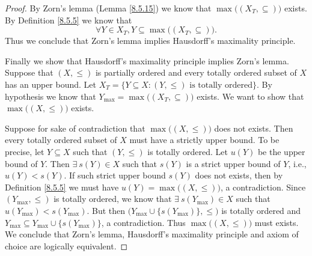 \begin{proof}
    By Zorn's lemma (Lemma \ref{8.5.15}) we know that \(\max\big((X_T, \subseteq)\big)\) exists.
    By Definition \ref{8.5.5} we know that
    \[
        \forall Y \in X_T, Y \subseteq \max\big((X_T, \subseteq)\big).
    \]
    Thus we conclude that Zorn's lemma implies Hausdorff's maximality principle.

    Finally we show that Hausdorff's maximality principle implies Zorn's lemma.
    Suppose that \((X, \leq)\) is partially ordered and every totally ordered subset of \(X\) has an upper bound.
    Let \(X_T = \{Y \subseteq X : (Y, \leq) \text{ is totally ordered}\}\).
    By hypothesis we know that \(Y_{\max} = \max\big((X_T, \subseteq)\big)\) exists.
    We want to show that \(\max\big((X, \leq)\big)\) exists.

    Suppose for sake of contradiction that \(\max\big((X, \leq)\big)\) does not exists.
    Then every totally ordered subset of \(X\) must have a strictly upper bound.
    To be precise, let \(Y \subseteq X\) such that \((Y, \leq)\) is totally ordered.
    Let \(u(Y)\) be the upper bound of \(Y\).
    Then \(\exists\ s(Y) \in X\) such that \(s(Y)\) is a strict upper bound of \(Y\), i.e., \(u(Y) < s(Y)\).
    If such strict upper bound \(s(Y)\) does not exists, then by Definition \ref{8.5.5} we must have \(u(Y) = \max\big((X, \leq)\big)\), a contradiction.
    Since \((Y_{\max}, \leq)\) is totally ordered, we know that \(\exists\ s(Y_{\max}) \in X\) such that \(u(Y_{\max}) < s(Y_{\max})\).
    But then \(\big(Y_{\max} \cup \{s(Y_{\max})\}, \leq\big)\) is totally ordered and \(Y_{\max} \subseteq Y_{\max} \cup \{s(Y_{\max})\}\), a contradiction.
    Thus \(\max\big((X, \leq)\big)\) must exists.
    We conclude that Zorn's lemma, Hausdorff's maximality principle and axiom of choice are logically equivalent.
\end{proof}

